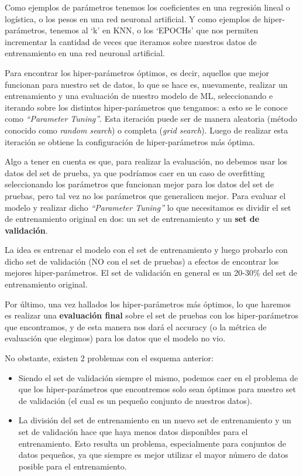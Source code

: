 \documentclass[12pt,a4paper]{article}
\begin{document}
\begin{sloppypar}
\begin{itemize}
Como ejemplos de parámetros tenemos los coeficientes en una regresión lineal o logística, o los pesos en una red neuronal artificial. Y como ejemplos de hiper-parámetros, tenemos al ‘k’ en KNN, o los ‘EPOCHs’ que nos permiten incrementar la cantidad de veces que iteramos sobre nuestros datos de entrenamiento en una red neuronal artificial. 

Para encontrar los hiper-parámetros óptimos, es decir, aquellos que mejor funcionan para nuestro set de datos, lo que se hace es, nuevamente, realizar un entrenamiento y una evaluación de nuestro modelo de ML, seleccionando e iterando sobre los distintos hiper-parámetros que tengamos: a esto se le conoce como \textit{“Parameter Tuning”}. Esta iteración puede ser de manera aleatoria (método conocido como \textit{random search}) o completa (\textit{grid search}). Luego de realizar esta iteración se obtiene la configuración de hiper-parámetros más óptima.

Algo a tener en cuenta es que, para realizar la evaluación, no debemos usar los datos del set de prueba, ya que podríamos caer en un caso de overfitting seleccionando los parámetros que funcionan mejor para los datos del set de pruebas, pero tal vez no los parámetros que generalicen mejor. Para evaluar el modelo y realizar dicho \textit{“Parameter Tuning”} lo que necesitamos es dividir el set de entrenamiento original en dos: un set de entrenamiento y un \textbf{set de validación}. 

La idea es entrenar el modelo con el set de entrenamiento y luego probarlo con dicho set de validación (NO con el set de pruebas) a efectos de encontrar los mejores hiper-parámetros. El set de validación en general es un 20-30\% del set de entrenamiento original.

Por último, una vez hallados los hiper-parámetros más óptimos, lo que haremos es realizar una \textbf{evaluación final} sobre el set de pruebas con los hiper-parámetros que encontramos, y de esta manera nos dará el accuracy (o la métrica de evaluación que elegimos) para los datos que el modelo no vio.

No obstante, existen 2 problemas con el esquema anterior:
\begin{itemize}
\item Siendo el set de validación siempre el mismo, podemos caer en el problema de que los hiper-parámetros que encontremos solo sean óptimos para nuestro set de validación (el cual es un pequeño conjunto de nuestros datos).
\item La división del set de entrenamiento en un nuevo set de entrenamiento y un set de validación hace que haya menos datos disponibles para el entrenamiento. Esto resulta un problema, especialmente para conjuntos de datos pequeños, ya que siempre es mejor utilizar el mayor número de datos posible para el entrenamiento.
\end{itemize}


\end{itemize}
\end{sloppypar}
\end{document}
